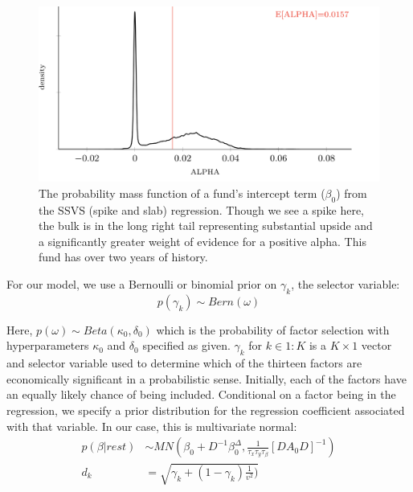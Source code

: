 \documentclass[11pt]{article}
\begin{document}
\begin{figure}[!h]
	\centering
	\includegraphics[width=400pt]{clinton_alpha_2_hl_sfvi.png}
	\parbox{400pt}{\caption{The probability mass function of a fund's intercept term ($\beta_0$) from the SSVS (spike and slab) regression. Though we see a spike here, the bulk is in the long right tail representing substantial upside and a significantly greater weight of evidence for a positive alpha. This fund has over two years of history.}}
\end{figure}

For our model, we use a Bernoulli or binomial prior on $\gamma_k$, the selector variable:
\begin{equation}
\label{eq:gamma_k_dist}
	p\left(\gamma_{k}\right) \sim Bern\left(\omega\right)
\end{equation}

Here, $p \left( \omega \right) \sim Beta \left(\kappa_{0},\delta_{0}\right)$ which is the probability of factor selection with hyperparameters $\kappa_0$ and $\delta_0$ specified as given. $\gamma_k$ for $k \in 1:K$ is a $K \times 1$ vector and selector variable used to determine which of the thirteen factors are economically significant in a probabilistic sense. Initially, each of the factors have an equally likely chance of being included. Conditional on a factor being in the regression, we specify a prior distribution for the regression coefficient associated with that variable. In our case, this is multivariate normal:
\begin{align}
	p\left(\beta|rest\right) &\sim MN\left(\beta_{0}+D^{-1}\beta_{0}^{\Delta},\frac{1}{\tau_{x}\tau_{y}\tau_{\beta}}\left[DA_{0}D\right]^{-1}\right)	\label{eq:beta_dist}\\
	d_{k} &= \sqrt{\gamma_{k}+(1-\gamma_{k})\frac{1}{v^{2}})} \label{eq:d_k}
\end{align}
\end{document}
